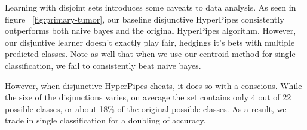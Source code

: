 \begin{figure*}
\centering
{}
\caption{Incremental results from a discrete dataset with many class values.}
\label{fig:primary-tumor}
\end{figure*}

Learning with disjoint sets introduces some caveats to data analysis. As seen in figure ~\ref{fig:primary-tumor}, our baseline disjunctive HyperPipes consistently outperforms both naive bayes and the original HyperPipes algorithm. However, our disjuntive learner doesn't exactly play fair, hedgings it's bets with multiple predicted classes. Note as well that when we use our centroid method for single classification, we fail to consistently beat naive bayes.

However, when disjunctive HyperPipes cheats, it does so with a conscious. While the size of the disjunctions varies, on average the set contains only 4 out of 22 possible classes, or about 18\% of the original possible classes. As a result, we trade in single classification for a doubling of accuracy.
